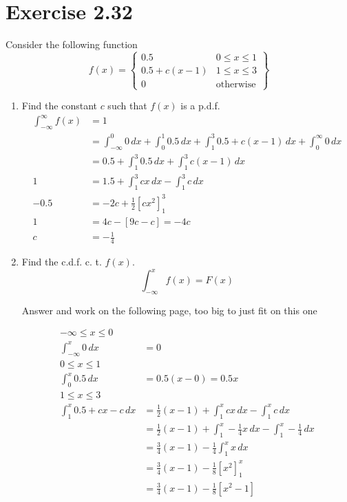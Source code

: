 \documentclass{article}
\begin{document}
\section*{Exercise 2.32}
Consider the following function
\[ f(x) = \left\{
\begin{array}{ll}
	0.5 & 0 \le x \le 1\\
	0.5 + c(x-1) & 1\leq x \leq 3\\
	0 & \text{otherwise}
	\end{array}
\right\} \]
\begin{enumerate}[\quad(a)]
	\item Find the constant $c$ such that $f(x)$ is a p.d.f.
	\begin{align*}
		\int_{-\infty}^\infty f(x) &= 1\\
		&= \int_{-\infty}^{0} 0\, dx + \int_{0}^{1} 0.5 \, dx + \int_{1}^{3} 0.5 + c(x-1)\, dx + \int_{0}^\infty 0 \, dx\\
		&= 0.5 + \int_{1}^{3} 0.5\, dx + \int_{1}^{3} c(x-1)\, dx\\
		1 &= 1.5 + \int_{1}^{3} cx\, dx - \int_{1}^{3} c\, dx\\
		-0.5 &= -2c + \tfrac{1}{2} [cx^2]_1^3\\
		1 &= 4c - [9c - c] = -4c\\
		c &= -\tfrac{1}{4}
	\end{align*}
	\item Find the c.d.f. c. t. $f(x)$.
	\[\int_{-\infty}^{x} f(x) = F(x)\]
	\begin{center}
		Answer and work on the following page, too big to just fit on this one
	\end{center}
	\begin{align*}
		-\infty \le x \leq 0\\
		\int_{-\infty}^{x} 0\, dx &= 0\\
		0 \le x \le 1\\
		\int_{0}^{x} 0.5\, dx &= 0.5(x-0) = 0.5x\\
		1 \leq x \leq 3\\
		\int_{1}^{x} 0.5 + cx - c\, dx &= \tfrac{1}{2}(x-1) + \int_{1}^{x} cx\, dx - \int_{1}^{x} c\, dx\\
		&= \tfrac{1}{2}(x-1) + \int_{1}^{x} -\tfrac{1}{4}x\, dx - \int_{1}^{x} -\tfrac{1}{4}\, dx\\
		&= \tfrac{3}{4}(x-1) - \frac{1}{4} \int_1^x x\,dx\\
		&= \tfrac{3}{4}(x-1) - \frac{1}{8} [x^2]_1^x\\
		&= \tfrac{3}{4}(x-1) - \frac{1}{8} [x^2-1]\\

\end{align*}
\end{enumerate}
\end{document}
